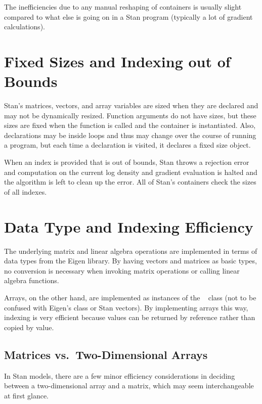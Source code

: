 The inefficiencies due to any manual reshaping of containers is
usually slight compared to what else is going on in a Stan program
(typically a lot of gradient calculations).


\section{Fixed Sizes and Indexing out of Bounds}

Stan's matrices, vectors, and array variables are sized when they are
declared and may not be dynamically resized.  Function arguments do
not have sizes, but these sizes are fixed when the function is called
and the container is instantiated.  Also, declarations may be inside
loops and thus may change over the course of running a program, but
each time a declaration is visited, it declares a fixed size object.

When an index is provided that is out of bounds, Stan throws a
rejection error and computation on the current log density and
gradient evaluation is halted and the algorithm is left to clean up
the error.  All of Stan's containers check the sizes of all indexes.



\section{Data Type and Indexing Efficiency}\label{indexingefficiency.section}

The underlying matrix and linear algebra operations are implemented in
terms of data types from the Eigen \Cpp library.  By having vectors
and matrices as basic types, no conversion is necessary when invoking
matrix operations or calling linear algebra functions.

Arrays, on the other hand, are implemented as instances of the \Cpp \
 class (not to be confused with Eigen's
 class or Stan vectors).  By implementing arrays
this way, indexing is very efficient because values can be returned by
reference rather than copied by value.

\subsection{Matrices vs.\ Two-Dimensional Arrays}

In Stan models, there are a few minor efficiency considerations in
deciding between a two-dimensional array and a matrix, which may seem
interchangeable at first glance.

